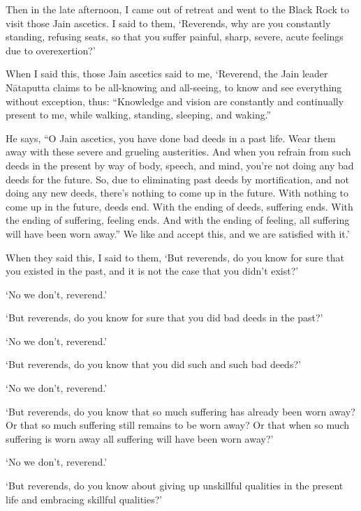 \documentclass[12pt,openany]{book}%
\begin{document}
Then in the late afternoon, I came out of retreat and went to the Black Rock to visit those Jain ascetics. I said to them, ‘Reverends, why are you constantly standing, refusing seats, so that you suffer painful, sharp, severe, acute feelings due to overexertion?’ 

When I said this, those Jain ascetics said to me, ‘Reverend, the Jain leader \textsanskrit{Nātaputta} claims to be all-knowing and all-seeing, to know and see everything without exception, thus: “Knowledge and vision are constantly and continually present to me, while walking, standing, sleeping, and waking.” 

He says, “O Jain ascetics, you have done bad deeds in a past life. Wear them away with these severe and grueling austerities. And when you refrain from such deeds in the present by way of body, speech, and mind, you’re not doing any bad deeds for the future. So, due to eliminating past deeds by mortification, and not doing any new deeds, there’s nothing to come up in the future. With nothing to come up in the future, deeds end. With the ending of deeds, suffering ends. With the ending of suffering, feeling ends. And with the ending of feeling, all suffering will have been worn away.” We like and accept this, and we are satisfied with it.’ 

When they said this, I said to them, ‘But reverends, do you know for sure that you existed in the past, and it is not the case that you didn’t exist?’ 

‘No we don’t, reverend.’ 

‘But reverends, do you know for sure that you did bad deeds in the past?’ 

‘No we don’t, reverend.’ 

‘But reverends, do you know that you did such and such bad deeds?’ 

‘No we don’t, reverend.’ 

‘But reverends, do you know that so much suffering has already been worn away? Or that so much suffering still remains to be worn away? Or that when so much suffering is worn away all suffering will have been worn away?’ 

‘No we don’t, reverend.’ 

‘But reverends, do you know about giving up unskillful qualities in the present life and embracing skillful qualities?’ 
\end{document}
